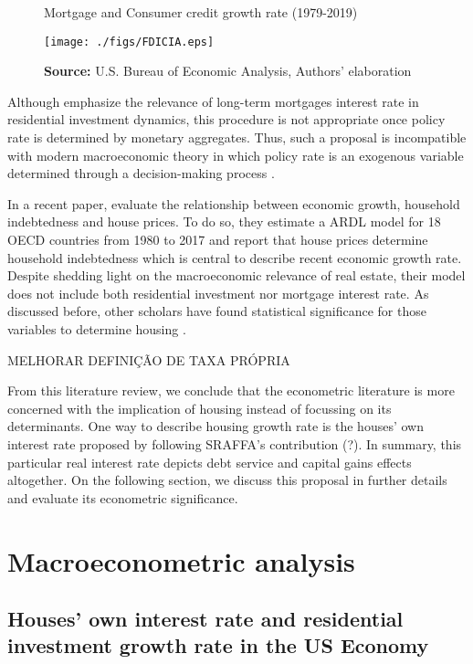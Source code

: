 \documentclass[11pt]{article}
\begin{document}
\begin{figure}[htb]
	\centering
	\caption{Mortgage and Consumer credit growth rate (1979-2019)}
	\label{Fig:CreditFDICIA}
	\texttt{[image: ./figs/FDICIA.eps]}
	\caption*{\textbf{Source:} U.S. Bureau of Economic Analysis, Authors' elaboration}
\end{figure}

Although \textcite{gauger_residential_2003} emphasize the relevance of long-term mortgages interest rate in residential investment dynamics, this procedure is not appropriate once policy rate is determined by monetary aggregates.
Thus, such a proposal is incompatible with modern macroeconomic theory in which policy rate is an exogenous variable determined through a decision-making process \cite[p.~230--256]{lavoie_post-keynesian_2015}.

In a recent paper, \textcite{wood_house_2020} evaluate the relationship between economic growth, household indebtedness and house prices.
To do so, they estimate a ARDL model for 18 OECD countries from 1980 to 2017 and report that house prices determine household indebtedness which is central to describe recent economic growth rate.
Despite shedding light on the macroeconomic relevance of real estate, their model does not include both residential investment nor mortgage interest rate.
As discussed before, other scholars have found statistical significance for those variables to determine housing \cite{gauger_residential_2003}.



MELHORAR DEFINIÇÃO DE TAXA PRÓPRIA

From this literature review, we conclude that the econometric literature is more concerned with the implication of housing instead of focussing on its determinants.
One way to describe housing growth rate is the houses' own interest rate proposed by \textcite{teixeira_crescimento_2015} following SRAFFA's contribution (?).
In summary, this particular real interest rate depicts debt service and capital gains effects altogether.
On the following section, we discuss this proposal in further details and evaluate its econometric significance.



\section{Macroeconometric analysis}
\label{sec:org28ac4a6}
\label{sec:VECM}
\subsection{Houses' own interest rate and residential investment growth rate in the US	Economy}
\label{sec:org1e8f43f}
\label{sc:own}
\end{document}
